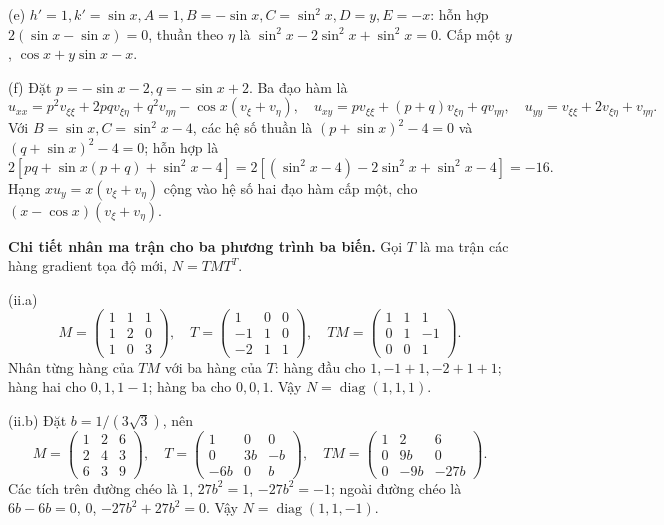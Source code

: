 \documentclass[10pt,a4paper]{article}
\begin{document}
(e) $h'=1,k'=\sin x,A=1,B=-\sin x,C=\sin^2x,D=y,E=-x$: hỗn hợp $2(\sin x-\sin x)=0$, thuần theo $\eta$ là $\sin^2x-2\sin^2x+\sin^2x=0$. Cấp một $y$, $\cos x+y\sin x-x$.

(f) Đặt $p=-\sin x-2,q=-\sin x+2$. Ba đạo hàm là
\[u_{xx}=p^2v_{\xi\xi}+2pqv_{\xi\eta}+q^2v_{\eta\eta}-\cos x(v_\xi+v_\eta),\quad
u_{xy}=pv_{\xi\xi}+(p+q)v_{\xi\eta}+qv_{\eta\eta},\quad
u_{yy}=v_{\xi\xi}+2v_{\xi\eta}+v_{\eta\eta}.\]
Với $B=\sin x,C=\sin^2x-4$, các hệ số thuần là $(p+\sin x)^2-4=0$ và $(q+\sin x)^2-4=0$; hỗn hợp là
\[2[pq+\sin x(p+q)+\sin^2x-4]
=2[(\sin^2x-4)-2\sin^2x+\sin^2x-4]=-16.\]
Hạng $xu_y=x(v_\xi+v_\eta)$ cộng vào hệ số hai đạo hàm cấp một, cho $(x-\cos x)(v_\xi+v_\eta)$.

\textbf{Chi tiết nhân ma trận cho ba phương trình ba biến.} Gọi $T$ là ma trận các hàng gradient tọa độ mới, $N=TMT^T$.

(ii.a)
\[M=\begin{pmatrix}1&1&1\\1&2&0\\1&0&3\end{pmatrix},\quad
T=\begin{pmatrix}1&0&0\\-1&1&0\\-2&1&1\end{pmatrix},\quad
TM=\begin{pmatrix}1&1&1\\0&1&-1\\0&0&1\end{pmatrix}.\]
Nhân từng hàng của $TM$ với ba hàng của $T$: hàng đầu cho $1,-1+1,-2+1+1$; hàng hai cho $0,1,1-1$; hàng ba cho $0,0,1$. Vậy $N=\operatorname{diag}(1,1,1)$.

(ii.b) Đặt $b=1/(3\sqrt3)$, nên
\[M=\begin{pmatrix}1&2&6\\2&4&3\\6&3&9\end{pmatrix},\quad
T=\begin{pmatrix}1&0&0\\0&3b&-b\\-6b&0&b\end{pmatrix},\quad
TM=\begin{pmatrix}1&2&6\\0&9b&0\\0&-9b&-27b\end{pmatrix}.\]
Các tích trên đường chéo là $1$, $27b^2=1$, $-27b^2=-1$; ngoài đường chéo là $6b-6b=0$, $0$, $-27b^2+27b^2=0$. Vậy $N=\operatorname{diag}(1,1,-1)$.
\end{document}

